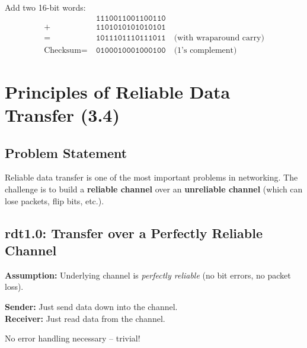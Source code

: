 \begin{formulabox}
Add two 16-bit words:
\begin{align*}
&\texttt{1110011001100110} \\
+\ &\texttt{1101010101010101} \\
=\ &\texttt{1011101110111011} \quad \text{(with wraparound carry)} \\
\text{Checksum} =\ &\texttt{0100010001000100} \quad \text{(1's complement)}
\end{align*}
\end{formulabox}

\section{Principles of Reliable Data Transfer (3.4)}

\subsection{Problem Statement}

Reliable data transfer is one of the most important problems in networking. The challenge is to build a \textbf{reliable channel} over an \textbf{unreliable channel} (which can lose packets, flip bits, etc.).

\begin{center}
\end{center}

\subsection{rdt1.0: Transfer over a Perfectly Reliable Channel}

\begin{keybox}
\textbf{Assumption:} Underlying channel is \emph{perfectly reliable} (no bit errors, no packet loss).

\textbf{Sender:} Just send data down into the channel.\\
\textbf{Receiver:} Just read data from the channel.

No error handling necessary -- trivial!
\end{keybox}

